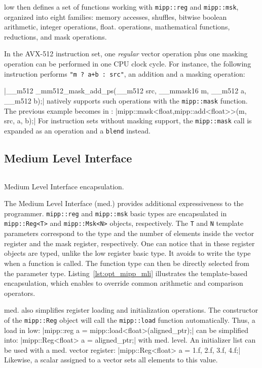 \MIPP low then defines a set of functions working with \verb|mipp::reg| and
\verb|mipp::msk|, organized into eight families: memory accesses, shuffles,
bitwise boolean arithmetic, integer operations, float. operations, mathematical
functions, reductions, and mask operations.

In the AVX-512 instruction set, one \textit{regular} vector operation plus one
masking operation can be performed in one CPU clock cycle. For instance, the
following instruction performs \verb|"m ? a+b : src"|, an addition and a masking
operation:

|__m512 _mm512_mask_add_ps(__m512 src, __mmask16 m, __m512 a, __m512 b);|
{\noindent
\MIPP natively supports such operations with the \verb|mipp::mask| function. The
previous example becomes in \MIPP:
}
|mipp::mask<float,mipp::add<float>>(m, src, a, b);|
{\noindent
For instruction sets without masking support, the \verb|mipp::mask| call is
expanded as an operation and a \verb|blend| instead.
}
\subsection{Medium Level Interface}

\begin{listing}[htp]
  \inputminted[frame=lines,linenos]{C++}{\curChapter/src/mipp/mli.cpp}
  \caption{Medium Level Interface encapsulation.}
  \label{lst:opt_mipp_mli}
\end{listing}

The \MIPP Medium Level Interface (\MIPP med.) provides additional expressiveness
to the programmer. \verb|mipp::reg| and \verb|mipp::msk| basic types are
encapsulated in \verb|mipp::Reg<T>| and \verb|mipp::Msk<N>| objects,
respectively. The \verb|T| and \verb|N| template parameters correspond to the
type and the number of elements inside the vector register and the mask
register, respectively. One can notice that in these register objects are typed,
unlike the \MIPP low register basic type. It avoids to write the type when a
\MIPP function is called. The function type can then be directly selected from
the parameter type. Listing~\ref{lst:opt_mipp_mli} illustrates the
template-based encapsulation, which enables \MIPP to override common arithmetic
and comparison operators.

\MIPP med. also simplifies register loading and initialization operations. The
constructor of the \verb|mipp::Reg| object will call the \verb|mipp::load|
function automatically. Thus, a load in \MIPP low:
|mipp::reg a = mipp::load<float>(aligned_ptr);|
{\noindent
can be simplified into:
}
|mipp::Reg<float> a = aligned_ptr;|
{\noindent
with \MIPP med. level. An initializer list
can be used with a \MIPP med. vector register:
}
|mipp::Reg<float> a = {1.f, 2.f, 3.f, 4.f};|
{\noindent
Likewise, a scalar assigned to a vector sets all elements to
this value.
}

